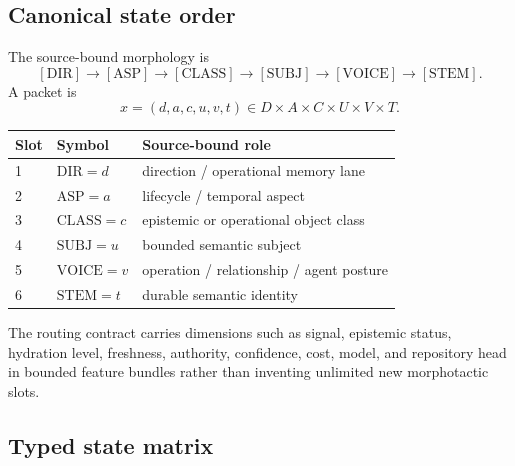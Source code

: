\documentclass[11pt]{article}
\begin{document}
\subsection{Canonical state order}

The source-bound morphology is
\[
[\mathrm{DIR}]\rightarrow[\mathrm{ASP}]\rightarrow[\mathrm{CLASS}]
\rightarrow[\mathrm{SUBJ}]\rightarrow[\mathrm{VOICE}]\rightarrow[\mathrm{STEM}].
\]
A packet is
\[
x=(d,a,c,u,v,t)\in D\times A\times C\times U\times V\times T.
\]

\begin{center}
\begin{tabular}{@{}lll@{}}
\toprule
Slot & Symbol & Source-bound role\\
\midrule
1 & \(\mathrm{DIR}=d\) & direction / operational memory lane\\
2 & \(\mathrm{ASP}=a\) & lifecycle / temporal aspect\\
3 & \(\mathrm{CLASS}=c\) & epistemic or operational object class\\
4 & \(\mathrm{SUBJ}=u\) & bounded semantic subject\\
5 & \(\mathrm{VOICE}=v\) & operation / relationship / agent posture\\
6 & \(\mathrm{STEM}=t\) & durable semantic identity\\
\bottomrule
\end{tabular}
\end{center}

The routing contract carries dimensions such as signal, epistemic status, hydration level, freshness, authority, confidence, cost, model, and repository head in bounded feature bundles rather than inventing unlimited new morphotactic slots.

\subsection{Typed state matrix}
\end{document}
